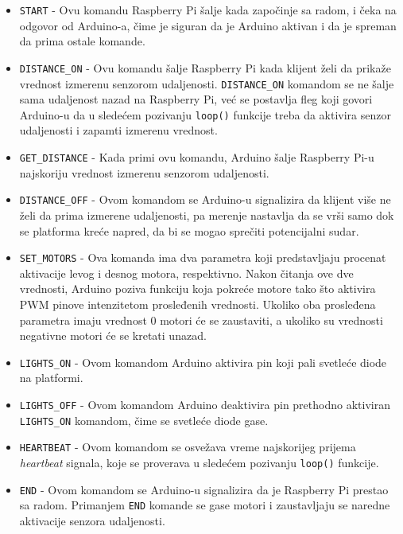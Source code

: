 \documentclass[12pt,a4paper]{report}
\begin{document}
 \begin{itemize}
\vspace{-1mm}
\item \texttt{START} - Ovu komandu Raspberry Pi šalje kada započinje sa radom, i čeka na odgovor od Arduino-a, čime je siguran da je Arduino aktivan i da je spreman da prima ostale komande.
\vspace{-1mm}
\item \texttt{DISTANCE\_ON} - Ovu komandu šalje Raspberry Pi kada klijent želi da prikaže vrednost izmerenu senzorom udaljenosti. \texttt{DISTANCE\_ON} komandom se ne šalje sama udaljenost nazad na Raspberry Pi, već se postavlja fleg koji govori Arduino-u da u sledećem pozivanju \texttt{loop()} funkcije treba da aktivira senzor udaljenosti i zapamti izmerenu vrednost.
\vspace{-1mm}
\item \texttt{GET\_DISTANCE} - Kada primi ovu komandu, Arduino šalje Raspberry Pi-u najskoriju vrednost izmerenu senzorom udaljenosti.
\vspace{-1mm}
\item \texttt{DISTANCE\_OFF} - Ovom komandom se Arduino-u signalizira da klijent više ne želi da prima izmerene udaljenosti, pa merenje nastavlja da se vrši samo dok se platforma kreće napred, da bi se mogao sprečiti potencijalni sudar.
\vspace{-1mm}
\item \texttt{SET\_MOTORS} - Ova komanda ima dva parametra koji predstavljaju procenat aktivacije levog i desnog motora, respektivno. Nakon čitanja ove dve vrednosti, Arduino poziva funkciju koja pokreće motore tako što aktivira PWM pinove intenzitetom prosleđenih vrednosti. Ukoliko oba prosleđena parametra imaju vrednost 0 motori će se zaustaviti, a ukoliko su vrednosti negativne motori će se kretati unazad.
\vspace{-1mm}
\item \texttt{LIGHTS\_ON} - Ovom komandom Arduino aktivira pin koji pali svetleće diode na platformi.
\vspace{-6mm}
\item \texttt{LIGHTS\_OFF} - Ovom komandom Arduino deaktivira pin prethodno aktiviran \texttt{LIGHTS\_ON} komandom, čime se svetleće diode gase.
\vspace{-1mm}
\item \texttt{HEARTBEAT} - Ovom komandom se osvežava vreme najskorijeg prijema \textit{heartbeat} signala, koje se proverava u sledećem pozivanju \texttt{loop()} funkcije.
\vspace{-1mm}
\item \texttt{END} - Ovom komandom se Arduino-u signalizira da je Raspberry Pi prestao sa radom. Primanjem \texttt{END} komande se gase motori i zaustavljaju se naredne aktivacije senzora udaljenosti.

\end{itemize}
\end{document}
